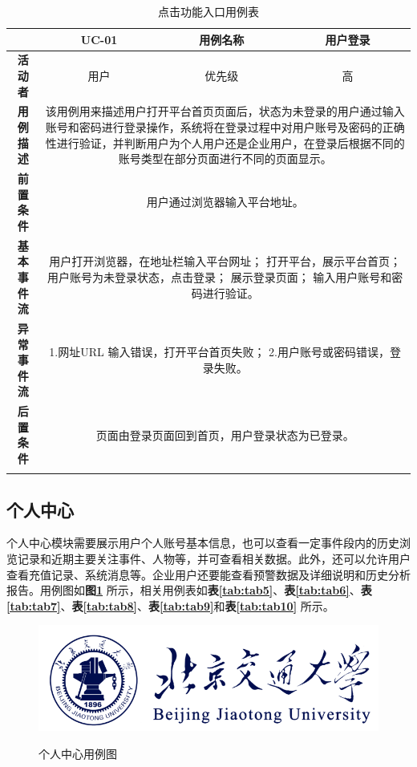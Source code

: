 \begin{longtable}[c]{c|ccc}
	\caption{点击功能入口用例表}
	\label{tab:tab4}\\
	\shline
	\multicolumn{1}{c|}{\textbf{用例编号}} & \multicolumn{1}{c|}{UC-01} & \multicolumn{1}{c|}{用例名称} &  用户登录\\ \hline
	\endhead
	\multicolumn{1}{c|}{\textbf{活动者}} & \multicolumn{1}{c|}{用户} & \multicolumn{1}{c|}{优先级} &高  \\ \hline
	\textbf{用例描述} & \multicolumn{3}{p{12cm}}{该用例用来描述用户打开平台首页页面后，状态为未登录的用户通过输入账号和密码进行登录操作，系统将在登录过程中对用户账号及密码的正确性进行验证，并判断用户为个人用户还是企业用户，在登录后根据不同的账号类型在部分页面进行不同的页面显示。} \\ \hline
	\textbf{前置条件}& \multicolumn{3}{p{12cm}}{用户通过浏览器输入平台地址。} \\ \hline
	\textbf{基本事件流}& \multicolumn{3}{p{12cm}}{用户打开浏览器，在地址栏输入平台网址；\newline
		打开平台，展示平台首页；\newline
		用户账号为未登录状态，点击登录；\newline
		展示登录页面；\newline
		输入用户账号和密码进行验证。} \\ \hline
	\textbf{异常事件流}& \multicolumn{3}{p{12cm}}{1.网址URL 输入错误，打开平台首页失败；\newline
		2.用户账号或密码错误，登录失败。
	} \\ \hline
	\textbf{后置条件}& \multicolumn{3}{p{12cm}}{页面由登录页面回到首页，用户登录状态为已登录。} \\ \shline
\end{longtable}

\subsection{个人中心}

个人中心模块需要展示用户个人账号基本信息，也可以查看一定事件段内的历史浏览记录和近期主要关注事件、人物等，并可查看相关数据。此外，还可以允许用户查看充值记录、系统消息等。企业用户还要能查看预警数据及详细说明和历史分析报告。用例图如\textbf{图\ref{fig:fig2}} 所示，相关用例表如\textbf{表\ref{tab:tab5}}、\textbf{表\ref{tab:tab6}}、\textbf{表\ref{tab:tab7}}、\textbf{表\ref{tab:tab8}}、\textbf{表\ref{tab:tab9}}和\textbf{表\ref{tab:tab10}}  所示。

\begin{figure}[!htb]
	\centering\label{fig:fig2}
	\includegraphics[scale=1]{image/logo1.png}
	\caption{个人中心用例图}
\end{figure}


